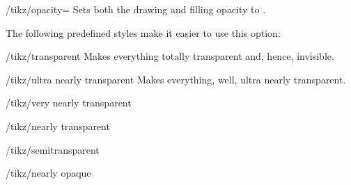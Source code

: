 \begin{key}{/tikz/opacity=}
    Sets both the drawing and filling opacity to .

    The following predefined styles make it easier to use this option:
    \begin{stylekey}{/tikz/transparent}
        Makes everything totally transparent and, hence, invisible.
\begin{codeexample}[]
\end{codeexample}
    \end{stylekey}

    \begin{stylekey}{/tikz/ultra nearly transparent}
        Makes everything, well, ultra nearly transparent.
\begin{codeexample}[]
\end{codeexample}
    \end{stylekey}

    \begin{stylekey}{/tikz/very nearly transparent}
\begin{codeexample}[]
\end{codeexample}
    \end{stylekey}

    \begin{stylekey}{/tikz/nearly transparent}
\begin{codeexample}[]
\end{codeexample}
    \end{stylekey}

    \begin{stylekey}{/tikz/semitransparent}
\begin{codeexample}[]
\end{codeexample}
    \end{stylekey}

    \begin{stylekey}{/tikz/nearly opaque}
\begin{codeexample}[]
\end{codeexample}
    \end{stylekey}


\end{key}
